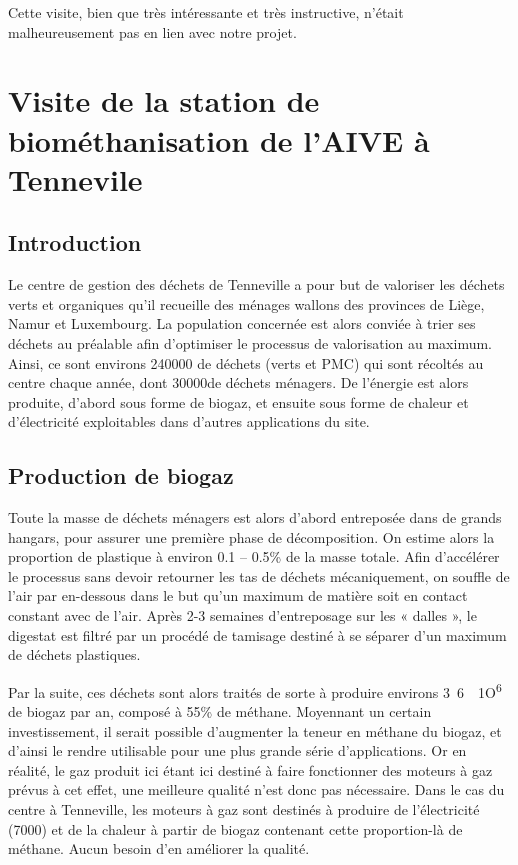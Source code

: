 Cette visite, bien que très intéressante et très instructive, n'était
malheureusement pas en lien avec notre projet.

\section{Visite de la station de biométhanisation de l'AIVE à Tennevile}
\subsection{Introduction}
Le centre de gestion des déchets de Tenneville a pour but de valoriser les 
déchets verts et organiques qu’il recueille des ménages wallons des provinces de 
Liège, Namur et Luxembourg. La population concernée est alors conviée à trier ses déchets 
au préalable afin d’optimiser le processus de valorisation au maximum. 
Ainsi, ce sont environs \unit{240000}{\ton} de déchets (verts et PMC) qui sont récoltés 
au centre chaque année, dont \unit{30000}{\ton}de déchets ménagers. De l’énergie est alors produite, 
d’abord sous forme de biogaz, et ensuite sous forme de chaleur et d’électricité exploitables 
dans d’autres applications du site.

\subsection{Production de biogaz}
Toute la masse de déchets ménagers est alors d’abord entreposée dans de grands hangars, 
pour assurer une première phase de décomposition. On estime alors la proportion de plastique 
à environ 0.1 – 0.5\% de la masse totale. Afin d’accélérer le processus sans devoir retourner 
les tas de déchets mécaniquement, on souffle de l’air par en-dessous dans le but qu’un maximum 
de matière soit en contact constant avec de l’air. Après 2-3 semaines d’entreposage sur 
les « dalles », le digestat est filtré par un procédé de tamisage destiné à se séparer d’un maximum de déchets plastiques. 

Par la suite, ces déchets sont alors traités de sorte à produire environs \unit{3.6 \cdot 1O^{6}}{\meter\cubed}
de biogaz par an, composé à 55\% de méthane. Moyennant un certain investissement, il 
serait possible d’augmenter la teneur en méthane du biogaz, et d’ainsi le rendre utilisable 
pour une plus grande série d’applications.
Or en réalité, le gaz produit ici étant ici destiné à faire fonctionner des moteurs à gaz prévus à cet effet, 
une meilleure qualité n’est donc pas nécessaire. Dans le cas du centre à Tenneville, les moteurs 
à gaz sont destinés à produire de l’électricité (\unit{7000}{\mega\watt\per\year}) et de la chaleur à partir de biogaz 
contenant cette proportion-là de méthane. Aucun besoin d’en améliorer la qualité. 

